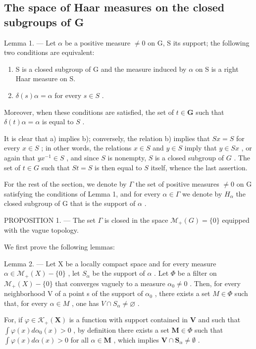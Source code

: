 \subsection{The space of Haar measures on the closed subgroups of G}

Lemma 1. --- Let \(\alpha\) be a positive measure \(\neq 0\) on G, S its support; the following two conditions are equivalent:

\begin{enumerate}
\def\labelenumi{\alph{enumi})}
\item
  S is a closed subgroup of G and the measure induced by \(\alpha\) on S is a right Haar measure on S.
\item
  \(\delta(s)\alpha = \alpha\) for every \(s \in S\) .
\end{enumerate}

Moreover, when these conditions are satisfied, the set of \(t \in \mathbf{G}\) such that \(\delta(t)\alpha = \alpha\) is equal to \(S\) .

It is clear that a) implies b); conversely, the relation b) implies that \(Sx = S\) for every \(x \in S\) ; in other words, the relations \(x \in S\) and \(y \in S\) imply that \(y \in Sx\) , or again that \(yx^{-1} \in S\) , and since \(S\) is nonempty, \(S\) is a closed subgroup of \(G\) . The set of \(t \in G\) such that \(St = S\) is then equal to \(S\) itself, whence the last assertion.

For the rest of the section, we denote by \(\Gamma\) the set of positive measures \(\neq0\) on G satisfying the conditions of Lemma 1, and for every \(\alpha\in\Gamma\) we denote by \(H_{\alpha}\) the closed subgroup of G that is the support of \(\alpha\) .

PROPOSITION 1. --- The set \(\Gamma\) is closed in the space \(\mathcal{M}_{+}(G) = \{0\}\) equipped with the vague topology.

We first prove the following lemmas:

Lemma 2. --- Let X be a locally compact space and for every measure \(\alpha \in \mathcal{M}_{+}(X) - \{0\}\) , let \(S_{\alpha}\) be the support of \(\alpha\) . Let \(\Phi\) be a filter on \(\mathcal{M}_{+}(X) - \{0\}\) that converges vaguely to a measure \(\alpha_{0} \neq 0\) . Then, for every neighborhood V of a point s of the support of \(\alpha_{0}\) , there exists a set \(M \in \Phi\) such that, for every \(\alpha \in M\) , one has \(V \cap S_{\alpha} \neq \varnothing\) .

For, if \(\varphi \in \mathcal{K}_{+}(\mathbf{X})\) is a function with support contained in \(\mathbf{V}\) and such that \(\int \varphi(x)d\alpha_0(x) > 0\) , by definition there exists a set \(\mathbf{M} \in \Phi\) such that \(\int \varphi(x)d\alpha(x) > 0\) for all \(\alpha \in \mathbf{M}\) , which implies \(\mathbf{V} \cap \mathbf{S}_{\alpha} \neq \emptyset\) .

